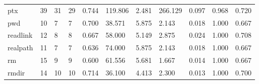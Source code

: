 \begin{longtable}{lp{1.8cm}p{1.8cm}p{1.8cm}p{1.8cm}p{1.8cm}p{1.8cm}p{1.8cm}p{1.8cm}p{1.8cm}p{1.8cm}}
ptx       &                           39 &                 31 &                                29 &                                      0.744 &                                119.806 &                                        2.481 &                           266.129 &                                   0.097 &                              0.968 &                                              0.720 \\
pwd       &                           10 &                  7 &                                 7 &                                      0.700 &                                 38.571 &                                        5.875 &                             2.143 &                                   0.018 &                              1.000 &                                              0.667 \\
readlink  &                           12 &                  8 &                                 8 &                                      0.667 &                                 58.000 &                                        5.149 &                             2.875 &                                   0.024 &                              1.000 &                                              0.708 \\
realpath  &                           11 &                  7 &                                 7 &                                      0.636 &                                 74.000 &                                        5.875 &                             2.143 &                                   0.018 &                              1.000 &                                              0.667 \\
rm        &                           15 &                  9 &                                 9 &                                      0.600 &                                 61.556 &                                        5.681 &                             1.667 &                                   0.014 &                              1.000 &                                              0.667 \\
rmdir     &                           14 &                 10 &                                10 &                                      0.714 &                                 36.100 &                                        4.413 &                             2.300 &                                   0.013 &                              1.000 &                                              0.700 \\

\end{longtable}

